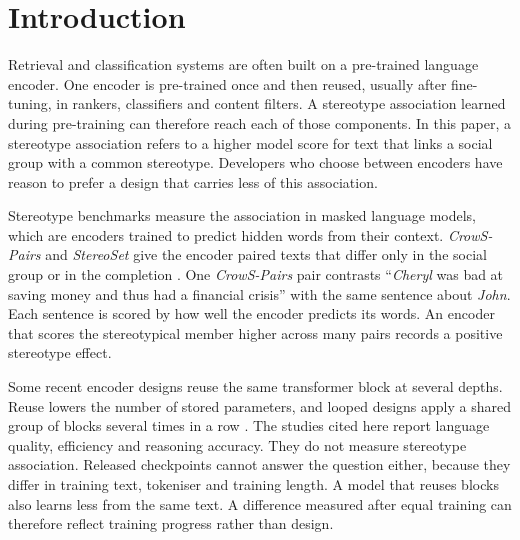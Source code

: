 \documentclass[sigconf,natbib=true]{acmart}
\begin{document}


\maketitle

\section{Introduction}
\label{sec:intro}

Retrieval and classification systems are often built on a pre-trained language
encoder. One encoder is pre-trained once and then reused, usually after
fine-tuning, in rankers, classifiers and content filters. A stereotype
association learned during pre-training can therefore reach each of those
components. In this paper, a stereotype association refers to a higher model
score for text that links a social group with a common stereotype. Developers
who choose between encoders have reason to prefer a design that carries less of
this association.

Stereotype benchmarks measure the association in masked language models, which
are encoders trained to predict hidden words from their context.
\emph{CrowS-Pairs} and \emph{StereoSet} give the encoder paired texts that differ
only in the social group or in the completion
\citep{nangia2020crows,nadeem2021stereoset}. One \emph{CrowS-Pairs} pair
contrasts ``\emph{Cheryl} was bad at saving money and thus had a financial
crisis'' with the same sentence about \emph{John}. Each sentence is scored by how
well the encoder predicts its words. An encoder that scores the stereotypical
member higher across many pairs records a positive stereotype effect.

Some recent encoder designs reuse the same transformer block at several depths.
Reuse lowers the number of stored parameters, and looped designs apply a shared
group of blocks several times in a row
\citep{lan2020albert,saunshi2025looped,zeitoun2026hyperloop}. The studies cited
here report language quality, efficiency and reasoning accuracy. They do not
measure stereotype association. Released checkpoints cannot answer the question
either, because they differ in training text, tokeniser and training length. A
model that reuses blocks also learns less from the same text. A difference
measured after equal training can therefore reflect training progress rather
than design.
\end{document}
